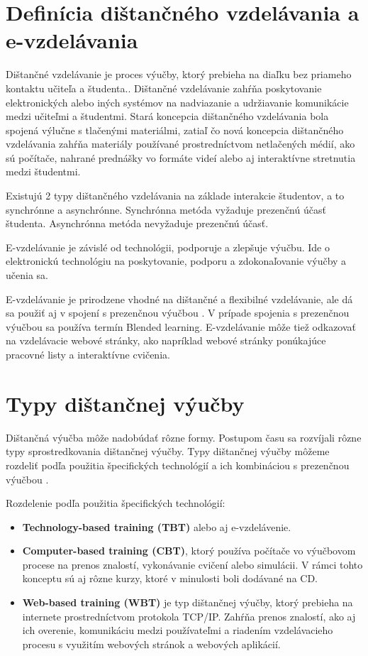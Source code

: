 \documentclass[10pt,oneside,slovak,a4paper]{article}
\begin{document}
\section{Definícia dištančného vzdelávania a e-vzdelávania}
\label{rozdiely}
Dištančné vzdelávanie je proces výučby, ktorý prebieha na diaľku bez priameho kontaktu učiteľa a študenta.\cite{India}.
Dištančné vzdelávanie zahŕňa poskytovanie elektronických alebo iných systémov na nadviazanie a udržiavanie komunikácie medzi učiteľmi a študentmi.
Stará koncepcia dištančného vzdelávania bola spojená výlučne s tlačenými materiálmi, zatiaľ čo nová koncepcia dištančného vzdelávania zahŕňa materiály používané prostredníctvom netlačených médií, ako sú počítače, nahrané prednášky vo formáte videí alebo aj interaktívne stretnutia medzi študentmi.

Existujú 2 typy dištančného vzdelávania na základe interakcie študentov, a to synchrónne a asynchrónne.
Synchrónna metóda vyžaduje prezenčnú účasť študenta.
Asynchrónna metóda nevyžaduje prezenčnú účasť.

E-vzdelávanie je závislé od technológii, podporuje a zlepšuje výučbu. Ide o elektronickú technológiu na poskytovanie, podporu a zdokonaľovanie výučby a učenia sa. 

E-vzdelávanie je prirodzene vhodné na dištančné a flexibilné vzdelávanie, ale dá sa použiť aj v spojení s prezenčnou výučbou \cite{elearningDef}.
V prípade spojenia s prezenčnou výučbou sa používa termín Blended learning. 
E-vzdelávanie môže tiež odkazovať na vzdelávacie webové stránky, ako napríklad webové stránky ponúkajúce pracovné listy a interaktívne cvičenia.


\section{Typy dištančnej výučby}
\label{typy}
Dištančná výučba môže nadobúdať rôzne formy. Postupom času sa rozvíjali rôzne typy sprostredkovania dištančnej výučby. Typy dištančnej výučby môžeme rozdeliť podľa použitia
špecifických technológií a ich kombináciou s prezenčnou výučbou \cite{WiktorzakKotowski}.

Rozdelenie podľa použitia špecifických technológií:
\begin{itemize}
	\item \textbf{Technology-based training (TBT)} alebo aj e-vzdelávenie.
	\item \textbf{Computer-based training (CBT)}, ktorý používa počítače vo výučbovom procese na prenos znalostí, vykonávanie cvičení alebo simulácii. V rámci tohto konceptu sú aj rôzne kurzy, ktoré v minulosti boli dodávané na CD.
	\item \textbf{Web-based training (WBT)} je typ dištančnej výučby, ktorý prebieha na internete prostredníctvom protokola TCP/IP. Zahŕňa prenos znalostí, ako aj ich overenie, komunikáciu medzi používateľmi a riadením vzdelávacieho procesu s využitím webových stránok a webových aplikácií.
\end{itemize}
\end{document}
